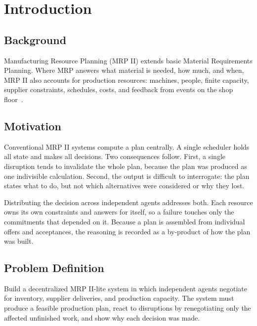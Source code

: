 \chapter{Introduction}
\label{ch:introduction}

\section{Background}

Manufacturing Resource Planning (MRP II) extends basic Material Requirements
Planning. Where MRP answers what material is needed, how much, and when,
MRP II also accounts for production resources: machines, people, finite
capacity, supplier constraints, schedules, costs, and feedback from events on
the shop floor~\cite{siemensmrp2,oracleglossary}.


\section{Motivation}

Conventional MRP II systems compute a plan centrally. A single scheduler holds
all state and makes all decisions. Two consequences follow. First, a single
disruption tends to invalidate the whole plan, because the plan was produced as
one indivisible calculation. Second, the output is difficult to interrogate: the
plan states what to do, but not which alternatives were considered or why they
lost.

Distributing the decision across independent agents addresses both. Each
resource owns its own constraints and answers for itself, so a failure touches
only the commitments that depended on it. Because a plan is assembled from
individual offers and acceptances, the reasoning is recorded as a by-product of
how the plan was built.

\section{Problem Definition}

Build a decentralized MRP II-lite system in which independent agents negotiate
for inventory, supplier deliveries, and production capacity. The system must
produce a feasible production plan, react to disruptions by renegotiating only
the affected unfinished work, and show why each decision was made.

